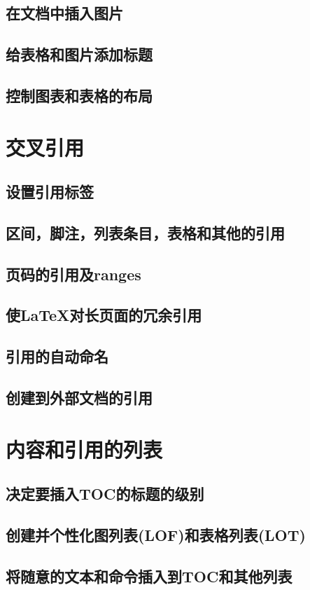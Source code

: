 \documentclass{book}
\begin{document}
	\section{在文档中插入图片}
	\section{给表格和图片添加标题}
	\section{控制图表和表格的布局}
\chapter{交叉引用}
	\section{设置引用标签}
	\section{区间，脚注，列表条目，表格和其他的引用}
	\section{页码的引用及ranges}
	\section{使LaTeX对长页面的冗余引用}
	\section{引用的自动命名}
	\section{创建到外部文档的引用}
\chapter{内容和引用的列表}
	\section{决定要插入TOC的标题的级别}
	\section{创建并个性化图列表(LOF)和表格列表(LOT)}
	\section{将随意的文本和命令插入到TOC和其他列表}
\end{document}
